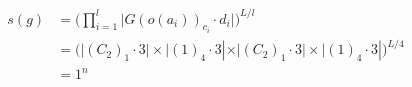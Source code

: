 \documentclass[preview]{standalone}
\begin{document}
\begin{align*}
s(g) &= \big(\prod_{i=1}^{l}\big|G(o(a_i))_{c_i}\cdot d_i\big|\big)^{L/l} \\   &= \big(\big|(C_2)_1\cdot 3\big| \times \big|(1)_4\cdot 3|\times \big|(C_2)_1\cdot 3\big| \times \big|(1)_4\cdot 3|)^{L/4} \\   &= 1^{n}
\end{align*}
\end{document}
